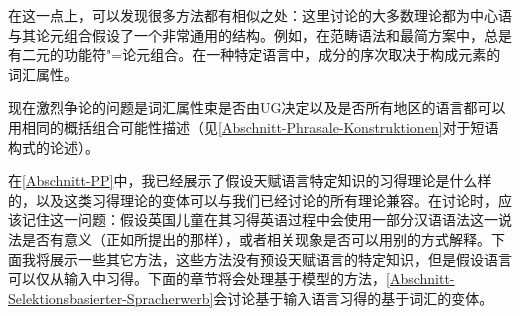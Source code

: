 在这一点上，可以发现很多方法都有相似之处：这里讨论的大多数理论都为中心语与其论元组合假设了一个非常通用的结构。例如，在范畴语法和最简方案中，总是有二元的功能符"=论元组合。在一种特定语言中，成分的序次取决于构成元素的词汇属性。

现在激烈争论的问题是词汇属性束是否由UG决定\citep[--7]{Chomsky2007a}以及是否所有地区的语言都可以用相同的概括组合可能性描述（见\ref{Abschnitt-Phrasale-Konstruktionen}对于短语构式的论述）。

在\ref{Abschnitt-PP}中，我已经展示了假设天赋语言特定知识的习得理论是什么样的，以及这类习得理论的变体可以与我们已经讨论的所有理论兼容。在讨论时，应该记住这一问题：假设英国儿童在其习得英语过程中会使用一部分汉语语法这一说法是否有意义（正如\citealp[]{Yang2004a}所提出的那样），或者相关现象是否可以用别的方式解释。下面我将展示一些其它方法，这些方法没有预设天赋语言的特定知识，但是假设语言可以仅从输入中习得。下面的章节将会处理基于模型的方法，\ref{Abschnitt-Selektionsbasierter-Spracherwerb}会讨论基于输入语言习得的基于词汇的变体。

